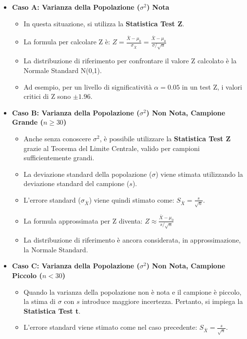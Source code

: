 \documentclass[12pt, a4paper]{article}
\newcommand{\samplemean}{\bar{X}} %
\newcommand{\popvar}{\sigma^2} %
\newcommand{\popsd}{\sigma} %
\newcommand{\samplesd}{s} %
\newcommand{\stderr}{\sigma_{\samplemean}} %
\newcommand{\alphaerr}{\alpha} %
\begin{document}
\begin{itemize}
    \item \textbf{Caso A: Varianza della Popolazione ($\popvar$) Nota}
        \begin{itemize}
            \item In questa situazione, si utilizza la \textbf{Statistica Test Z}.
            \item La formula per calcolare Z è: $Z = \frac{\samplemean - \mu_0}{\stderr} = \frac{\samplemean - \mu_0}{\popsd / \sqrt{n}}$
            \item La distribuzione di riferimento per confrontare il valore Z calcolato è la Normale Standard N(0,1).
            \item Ad esempio, per un livello di significatività $\alphaerr=0.05$ in un test Z, i valori critici di Z sono $\pm 1.96$.
        \end{itemize}
    \item \textbf{Caso B: Varianza della Popolazione ($\popvar$) Non Nota, Campione Grande ($n \ge 30$)}
        \begin{itemize}
            \item Anche senza conoscere $\popvar$, è possibile utilizzare la \textbf{Statistica Test Z} grazie al Teorema del Limite Centrale, valido per campioni sufficientemente grandi.
            \item La deviazione standard della popolazione ($\popsd$) viene stimata utilizzando la deviazione standard del campione ($\samplesd$).
            \item L'errore standard ($\stderr$) viene quindi stimato come: $S_{\samplemean} = \frac{\samplesd}{\sqrt{n}}$.
            \item La formula approssimata per Z diventa: $Z \approx \frac{\samplemean - \mu_0}{\samplesd / \sqrt{n}}$
            \item La distribuzione di riferimento è ancora considerata, in approssimazione, la Normale Standard.
        \end{itemize}
    \item \textbf{Caso C: Varianza della Popolazione ($\popvar$) Non Nota, Campione Piccolo ($n < 30$)}
        \begin{itemize}
            \item Quando la varianza della popolazione non è nota e il campione è piccolo, la stima di $\popsd$ con $\samplesd$ introduce maggiore incertezza. Pertanto, si impiega la \textbf{Statistica Test t}.
            \item L'errore standard viene stimato come nel caso precedente: $S_{\samplemean} = \frac{\samplesd}{\sqrt{n}}$.

\end{itemize}
\end{itemize}
\end{document}
